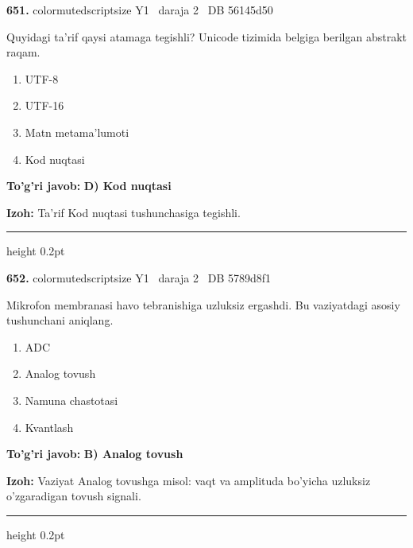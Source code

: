 \documentclass[10pt,a4paper,oneside]{article}
\begin{document}
\noindent\textbf{\color{ink}651.}  {color{muted}scriptsize Y1 \textbullet\ daraja 2 \textbullet\ DB 56145d50}
\par
Quyidagi ta'rif qaysi atamaga tegishli? Unicode tizimida belgiga berilgan abstrakt raqam.
\begin{enumerate}[label=\Alph*),leftmargin=9mm]
\item UTF-8
\item UTF-16
\item Matn metama'lumoti
\item Kod nuqtasi
\end{enumerate}
\begin{tcolorbox}[enhanced,breakable,colback=teal!4,colframe=teal!50!black,boxrule=0.5pt,arc=1.1mm,left=3mm,right=3mm,top=1.7mm,bottom=1.7mm,before skip=2mm,after skip=2mm]
\textbf{\color{teal}To'g'ri javob:} \textbf{D) Kod nuqtasi}
\par\smallskip
\textbf{Izoh:} Ta'rif Kod nuqtasi tushunchasiga tegishli.
\end{tcolorbox}
\vspace{2mm}\hrule height 0.2pt \vspace{3mm}

\noindent\textbf{\color{ink}652.}  {color{muted}scriptsize Y1 \textbullet\ daraja 2 \textbullet\ DB 5789d8f1}
\par
Mikrofon membranasi havo tebranishiga uzluksiz ergashdi. Bu vaziyatdagi asosiy tushunchani aniqlang.
\begin{enumerate}[label=\Alph*),leftmargin=9mm]
\item ADC
\item Analog tovush
\item Namuna chastotasi
\item Kvantlash
\end{enumerate}
\begin{tcolorbox}[enhanced,breakable,colback=teal!4,colframe=teal!50!black,boxrule=0.5pt,arc=1.1mm,left=3mm,right=3mm,top=1.7mm,bottom=1.7mm,before skip=2mm,after skip=2mm]
\textbf{\color{teal}To'g'ri javob:} \textbf{B) Analog tovush}
\par\smallskip
\textbf{Izoh:} Vaziyat Analog tovushga misol: vaqt va amplituda bo'yicha uzluksiz o'zgaradigan tovush signali.
\end{tcolorbox}
\vspace{2mm}\hrule height 0.2pt \vspace{3mm}
\end{document}
